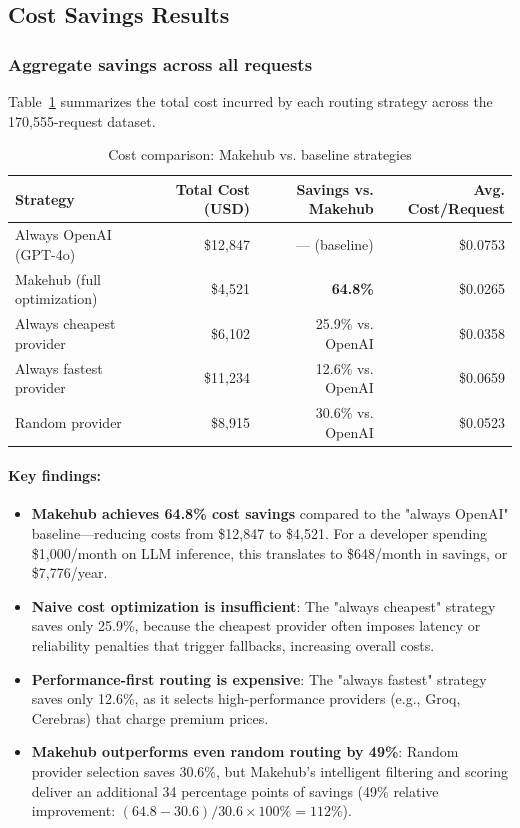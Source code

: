 \documentclass[english]{article}
\begin{document}
\subsection{Cost Savings Results}

\subsubsection{Aggregate savings across all requests}

Table~\ref{tab:cost_comparison} summarizes the total cost incurred by each routing strategy across the 170,555-request dataset.

\begin{table}[H]
\centering
\caption{Cost comparison: Makehub vs. baseline strategies}
\label{tab:cost_comparison}
\begin{tabular}{|l|r|r|r|}
\hline
\textbf{Strategy} & \textbf{Total Cost (USD)} & \textbf{Savings vs. Makehub} & \textbf{Avg. Cost/Request} \\
\hline
Always OpenAI (GPT-4o) & \$12,847 & — (baseline) & \$0.0753 \\
\hline
Makehub (full optimization) & \$4,521 & \textbf{64.8\%} & \$0.0265 \\
\hline
Always cheapest provider & \$6,102 & 25.9\% vs. OpenAI & \$0.0358 \\
\hline
Always fastest provider & \$11,234 & 12.6\% vs. OpenAI & \$0.0659 \\
\hline
Random provider & \$8,915 & 30.6\% vs. OpenAI & \$0.0523 \\
\hline
\end{tabular}
\end{table}

\paragraph{Key findings:}

\begin{itemize}
\item \textbf{Makehub achieves 64.8\% cost savings} compared to the "always OpenAI" baseline—reducing costs from \$12,847 to \$4,521. For a developer spending \$1,000/month on LLM inference, this translates to \$648/month in savings, or \$7,776/year.

\item \textbf{Naive cost optimization is insufficient}: The "always cheapest" strategy saves only 25.9\%, because the cheapest provider often imposes latency or reliability penalties that trigger fallbacks, increasing overall costs.

\item \textbf{Performance-first routing is expensive}: The "always fastest" strategy saves only 12.6\%, as it selects high-performance providers (e.g., Groq, Cerebras) that charge premium prices.

\item \textbf{Makehub outperforms even random routing by 49\%}: Random provider selection saves 30.6\%, but Makehub's intelligent filtering and scoring deliver an additional 34 percentage points of savings (49\% relative improvement: $(64.8 - 30.6) / 30.6 \times 100\% = 112\%$).
\end{itemize}
\end{document}
